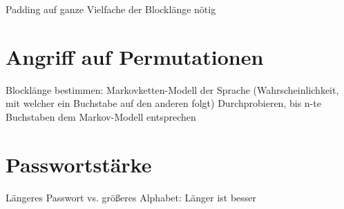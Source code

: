 Padding auf ganze Vielfache der Blocklänge nötig

\section{Angriff auf Permutationen}

Blocklänge bestimmen: Markovketten-Modell der Sprache (Wahrscheinlichkeit, mit welcher ein Buchstabe auf den anderen folgt)
Durchprobieren, bis n-te Buchstaben dem Markov-Modell entsprechen

\section{Passwortstärke}

Längeres Passwort vs. größeres Alphabet: Länger ist besser

